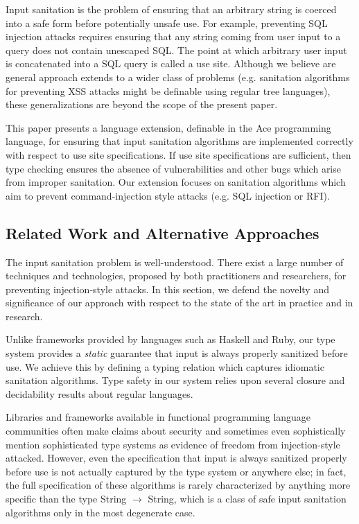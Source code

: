 \documentclass[10pt,preprint]{sigplanconf}
\theoremstyle{definition}
\begin{document}
Input sanitation is the problem of ensuring that an arbitrary string
is coerced into a safe form before potentially unsafe use. For example, 
preventing SQL injection attacks requires ensuring that any string
coming from user input to a query does not contain unescaped SQL. 
The point at which arbitrary user input is concatenated into a SQL query is called a use site.
Although we believe are general approach extends to a wider class of problems
(e.g. sanitation algorithms for preventing XSS attacks might be definable using
regular tree languages), these generalizations are beyond the scope of the 
present paper.

This paper presents a language extension, definable in the Ace programming language,
for ensuring that input sanitation algorithms are implemented correctly with
respect to use site specifications. If use site specifications are sufficient, 
then type checking ensures the absence of vulnerabilities and other bugs which
arise from improper sanitation. Our extension focuses on sanitation algorithms 
which aim to prevent command-injection style attacks (e.g. SQL injection or RFI). 

\subsection{Related Work and Alternative Approaches}

The input sanitation problem is well-understood. There exist a large number
of techniques and technologies, proposed by both practitioners and researchers, for
preventing injection-style attacks. In this section, we defend the novelty and
significance of our approach with respect to the state of the art in practice 
and in research.

Unlike frameworks provided by languages such as Haskell and
Ruby, our type system provides a \emph{static} guarantee that input is always 
properly sanitized before use. We achieve this by defining a typing relation
which captures idiomatic sanitation algorithms. Type safety in our system relies upon 
several closure and decidability results about regular languages. 

Libraries and frameworks available in functional programming language communities often
make claims about security and sometimes even sophistically mention sophisticated
type systems as evidence of freedom from injection-style attacked.
However, even the specification that input is always sanitized properly before use is not
actually captured by the type system or anywhere else; in fact, the full specification of these
algorithms is rarely characterized by anything more specific than the type
String $\rightarrow$ String, which is a class of safe input sanitation algorithms
only in the most degenerate case.
\end{document}
